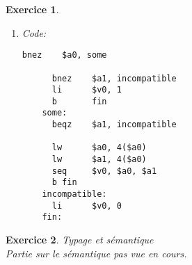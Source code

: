 \documentclass{article}
\theoremstyle{plain}
\newtheorem{exo}{Exercice}%
\begin{document}
\begin{exo}
\begin{enumerate}
  \item Code:
    \begin{lstlisting}[texcl=fasle, mathescape=false]
      bnez    $a0, some
      
      bnez    $a1, incompatible
      li      $v0, 1
      b       fin
    some:
      beqz    $a1, incompatible

      lw      $a0, 4($a0)
      lw      $a1, 4($a0)
      seq     $v0, $a0, $a1
      b fin
    incompatible:
      li      $v0, 0
    fin:
    \end{lstlisting}
\end{enumerate}
\end{exo}

\newpage
\begin{exo}Typage et sémantique\\
Partie sur le sémantique pas vue en cours.
\end{exo}
\end{document}
